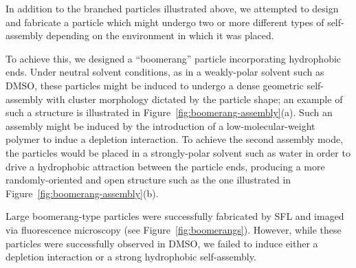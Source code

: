 In addition to the branched particles illustrated above, we attempted to design and fabricate 
a particle which might undergo two or more different types of self-assembly depending on the environment
in which it was placed.  

To achieve this, we designed a ``boomerang'' particle incorporating 
hydrophobic ends.  Under neutral solvent conditions, as in a weakly-polar solvent such as DMSO, these particles
might be induced to undergo a 
dense geometric self-assembly with cluster morphology dictated by the 
particle shape; an example of such a structure is illustrated in Figure~\ref{fig:boomerang-assembly}(a).
Such an assembly might be induced by the introduction of a low-molecular-weight polymer to indue a 
depletion interaction.  To achieve the second assembly mode, the particles would be 
placed in a strongly-polar solvent such as water in order to drive a hydrophobic attraction between 
the particle ends, producing a more randomly-oriented and open structure such as the one illustrated
in Figure~\ref{fig:boomerang-assembly}(b).

Large boomerang-type particles were successfully fabricated by SFL and imaged via fluorescence 
microscopy (see Figure~\ref{fig:boomerangs}).  However, while these particles were successfully 
observed in DMSO, we failed to induce either a depletion interaction or a strong hydrophobic 
self-assembly.
